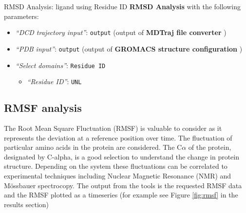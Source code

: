 \documentclass[twocolumn]{bmcart}%
\providecommand{\tightlist}{%
  \setlength{\itemsep}{0pt}\setlength{\parskip}{0pt}}
\begin{document}
\begin{handson_box_colour}{RMSD Analysis: ligand using Residue ID}
  \textbf{RMSD Analysis} with the following parameters:

  \begin{itemize}
  \tightlist
  \item
    \emph{``DCD trajectory input''}: \texttt{output} (output of
    \textbf{MDTraj file converter} )
  \item
    \emph{``PDB input''}: \texttt{output} (output of \textbf{GROMACS
    structure configuration} )
  \item
    \emph{``Select domains''}: \texttt{Residue\ ID}

    \begin{itemize}
    \tightlist
    \item
      \emph{``Residue ID''}: \texttt{UNL}
    \end{itemize}
  \end{itemize}



\end{handson_box_colour}



\hypertarget{rmsf-analysis}{%
\subsection*{RMSF analysis}\label{rmsf-analysis}}

The Root Mean Square Fluctuation (RMSF) is valuable to consider as it represents the deviation at a reference position over time. The fluctuation of particular amino acids in the protein are considered. The C$\alpha$ of the protein, designated by C-alpha, is a good selection to understand the change in protein structure. Depending on the system these fluctuations can be correlated to experimental techniques including Nuclear Magnetic Resonance (NMR) and M\"{o}ssbauer spectrocopy. The output from the tools is the requested RMSF data and the RMSF plotted as a timeseries (for example see Figure \ref{fig:rmsf} in the results section)
\end{document}
